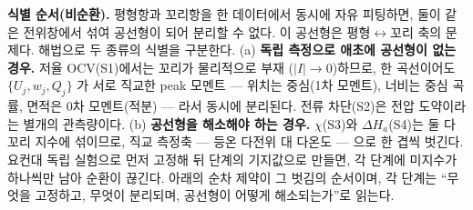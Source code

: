 \documentclass[11pt,a4paper]{article}
\begin{document}
\textbf{식별 순서(비순환).} 평형항과 꼬리항을 한 데이터에서 동시에 자유 피팅하면, 둘이 같은 전위창에서 섞여
공선형이 되어 분리할 수 없다. 이 공선형은 평형$\leftrightarrow$꼬리 축의 문제다. 해법으로 두 종류의 식별을
구분한다. (a) \textbf{독립 측정으로 애초에 공선형이 없는 경우.} 저율 OCV(S1)에서는 꼬리가 물리적으로 부재
($|I|\to0$)하므로, 한 곡선이어도 $\{U_j,w_j,Q_j\}$ 가 서로 직교한 peak 모멘트 — 위치는 중심(1차 모멘트),
너비는 중심 곡률, 면적은 0차 모멘트(적분) — 라서 동시에 분리된다. 전류 차단(S2)은 전압 도약이라는 별개의
관측량이다. (b) \textbf{공선형을 해소해야 하는 경우.} $\chi$(S3)와 $\Delta H_a$(S4)는 둘 다 꼬리 지수에
섞이므로, 직교 측정축 — 등온 다전위 대 다온도 — 으로 한 겹씩 벗긴다. 요컨대 독립 실험으로 먼저 고정해 뒤 단계의
기지값으로 만들면, 각 단계에 미지수가 하나씩만 남아 순환이 끊긴다. 아래의 순차 제약이 그 벗김의 순서이며, 각
단계는 ``무엇을 고정하고, 무엇이 분리되며, 공선형이 어떻게 해소되는가''로 읽는다.
\end{document}
